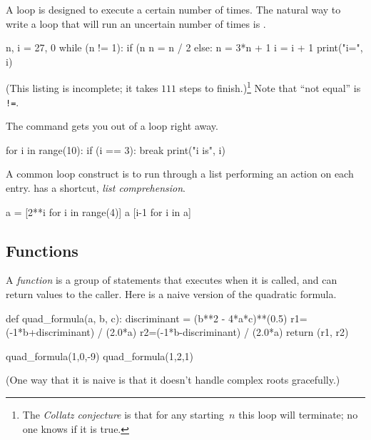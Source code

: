 A  loop is designed to execute a certain
number of times.
The natural way to write a loop that will run an uncertain number of times
is .
\begin{pythonconsole}
n, i = 27, 0
while (n != 1):
    if (n %
        n = n / 2
    else:
        n = 3*n + 1
    i = i + 1
    print("i=", i)

\end{pythonconsole}
\noindent
(This listing is incomplete; it takes $111$ steps to finish.)\footnote{The 
\protect\textit{Collatz conjecture} is 
that for any starting~$n$ this loop will 
terminate; no one knows if it is true.}
Note that ``not equal'' is \lstinline[style=inline]@!=@. 

The  command gets you out of a loop right away.
\begin{pythonconsole}
for i in range(10):
    if (i == 3):
        break
    print("i is", i)

\end{pythonconsole}

A common loop construct is to run through a list
performing an action on each entry.
\python{} has a shortcut, \textit{list comprehension}.
\begin{pythonconsole}
a = [2**i for i in range(4)]
a
[i-1 for i in a]
\end{pythonconsole}



\subsection{Functions}
A \textit{function} is a group of statements that executes when it is called,
and can return values to the caller.
Here is a naive version of the quadratic formula.
\begin{pythonconsole}
def quad_formula(a, b, c):
    discriminant = (b**2 - 4*a*c)**(0.5)
    r1=(-1*b+discriminant) / (2.0*a)
    r2=(-1*b-discriminant) / (2.0*a)
    return (r1, r2)

quad_formula(1,0,-9)
quad_formula(1,2,1)
\end{pythonconsole}
\noindent
(One way that it is naive is that it doesn't handle complex roots gracefully.)
%

